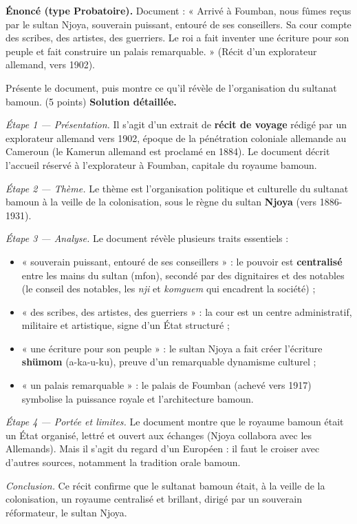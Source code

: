 \documentclass[11pt]{article}
\newcommand{\cle}[1]{{\popxbold\color{popdark}#1}}
\begin{document}
\begin{exoresolu}
\textbf{Énoncé (type Probatoire).} Document : « Arrivé à Foumban, nous fûmes reçus par le sultan Njoya, souverain puissant, entouré de ses conseillers. Sa cour compte des scribes, des artistes, des guerriers. Le roi a fait inventer une écriture pour son peuple et fait construire un palais remarquable. » (Récit d'un explorateur allemand, vers 1902).

Présente le document, puis montre ce qu'il révèle de l'organisation du sultanat bamoun. (5 points)
\tcblower
\textbf{Solution détaillée.}

\emph{Étape 1 — Présentation.} Il s'agit d'un extrait de \textbf{récit de voyage} rédigé par un explorateur allemand vers 1902, époque de la pénétration coloniale allemande au Cameroun (le Kamerun allemand est proclamé en 1884). Le document décrit l'accueil réservé à l'explorateur à Foumban, capitale du royaume bamoun.

\emph{Étape 2 — Thème.} Le thème est l'organisation politique et culturelle du \cle{sultanat bamoun} à la veille de la colonisation, sous le règne du sultan \textbf{Njoya} (vers 1886-1931).

\emph{Étape 3 — Analyse.} Le document révèle plusieurs traits essentiels :
\begin{itemize}
\item « souverain puissant, entouré de ses conseillers » : le pouvoir est \textbf{centralisé} entre les mains du sultan (mfon), secondé par des dignitaires et des notables (le conseil des notables, les \emph{nji} et \emph{komguem} qui encadrent la société) ;
\item « des scribes, des artistes, des guerriers » : la cour est un centre administratif, militaire et artistique, signe d'un État structuré ;
\item « une écriture pour son peuple » : le sultan Njoya a fait créer l'écriture \textbf{shümom} (a-ka-u-ku), preuve d'un remarquable dynamisme culturel ;
\item « un palais remarquable » : le palais de Foumban (achevé vers 1917) symbolise la puissance royale et l'architecture bamoun.
\end{itemize}

\emph{Étape 4 — Portée et limites.} Le document montre que le royaume bamoun était un État organisé, lettré et ouvert aux échanges (Njoya collabora avec les Allemands). Mais il s'agit du regard d'un Européen : il faut le croiser avec d'autres sources, notamment la tradition orale bamoun.

\emph{Conclusion.} Ce récit confirme que le sultanat bamoun était, à la veille de la colonisation, un royaume centralisé et brillant, dirigé par un souverain réformateur, le sultan Njoya.
\end{exoresolu}
\end{document}

